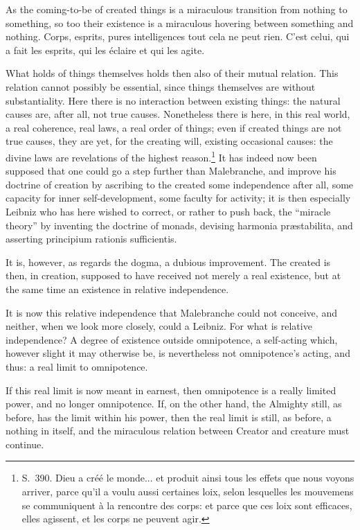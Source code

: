 \documentclass[12pt,a4paper]{article}
\begin{document}
As the coming-to-be of created things is a miraculous transition from nothing to
something, so too their existence is a miraculous hovering between something and
nothing. Corps, esprits, pures intelligences tout cela ne peut rien. C'est celui,
qui a fait les esprits, qui les éclaire et qui les agite.

What holds of things themselves holds then also of their mutual relation. This
relation cannot possibly be essential, since things themselves are without
substantiality. Here there is no interaction between existing things: the natural
causes are, after all, not true causes. Nonetheless there is here, in this real
world, a real coherence, real laws, a real order of things; even if created things
are not true causes, they are yet, for the creating will, existing occasional
causes: the divine laws are revelations of the highest reason.\footnote{S.~390.
Dieu a créé le monde... et produit ainsi tous les effets que nous voyons arriver,
parce qu'il a voulu aussi certaines loix, selon lesquelles les mouvemens se
communiquent à la rencontre des corps: et parce que ces loix sont efficaces, elles
agissent, et les corps ne peuvent agir.}
It has indeed now been supposed that one could go a step further than Malebranche,
and improve his doctrine of creation by ascribing to the created some independence
after all, some capacity for inner self-development, some faculty for activity; it
is then especially Leibniz who has here wished to correct, or rather to push back,
the ``miracle theory'' by inventing the doctrine of monads, devising harmonia
præstabilita, and asserting principium rationis sufficientis.

It is, however, as regards the dogma, a dubious improvement. The created is then,
in creation, supposed to have received not merely a real existence, but at the same
time an existence in relative independence.

It is now this relative independence that Malebranche could not conceive, and
neither, when we look more closely, could a Leibniz. For what is relative
independence? A degree of existence outside omnipotence, a self-acting which,
however slight it may otherwise be, is nevertheless not omnipotence's acting, and
thus: a real limit to omnipotence.

If this real limit is now meant in earnest, then omnipotence is a really limited
power, and no longer omnipotence. If, on the other hand, the Almighty still, as
before, has the limit within his power, then the real limit is still, as before, a
nothing in itself, and the miraculous relation between Creator and creature must
continue.
\end{document}
